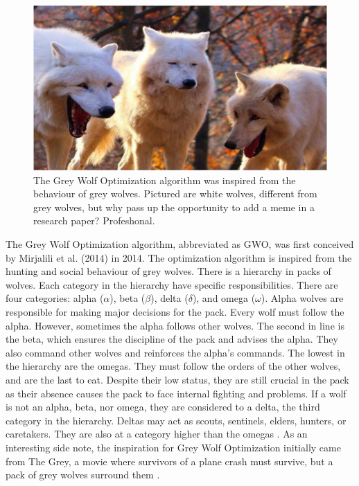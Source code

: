 \begin{figure}[h!]
	\centering
	\includegraphics{./images/chap01-introduction/wolves.jpg}
	\caption{The Grey Wolf Optimization algorithm was inspired from the behaviour of grey wolves. Pictured are white wolves, different from grey wolves, but why pass up the opportunity to add a meme in a research paper? Profeshonal.}
	\label{wolves-meme}
\end{figure}

The Grey Wolf Optimization algorithm, abbreviated as GWO, was first conceived by Mirjalili  et al. (2014) in 2014. The optimization algorithm is inspired from the hunting and social behaviour of grey wolves. There is a hierarchy in packs of wolves. Each category in the hierarchy have specific responsibilities. There are four categories: alpha ($\alpha$), beta ($\beta$), delta ($\delta$), and omega ($\omega$). Alpha wolves are responsible for making major decisions for the pack. Every wolf must follow the alpha. However, sometimes the alpha follows other wolves. The second in line is the beta, which ensures the discipline of the pack and advises the alpha. They also command other wolves and reinforces the alpha's commands. The lowest in the hierarchy are the omegas. They must follow the orders of the other wolves, and are the last to eat. Despite their low status, they are still crucial in the pack as their absence causes the pack to face internal fighting and problems. If a wolf is not an alpha, beta, nor omega, they are considered to a delta, the third category in the hierarchy. Deltas may act as scouts, sentinels, elders, hunters, or caretakers. They are also at a category higher than the omegas \cite{Mirjalili2014} \cite{Gupta2018}. As an interesting side note, the inspiration for Grey Wolf Optimization initially came from The Grey, a movie where survivors of a plane crash must survive, but a pack of grey wolves surround them \cite{TheGreyPlotSummary2011}.

